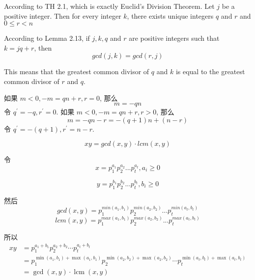 \documentclass[a4paper, justified]{tufte-handout}
\begin{document}
\begin{problem}[CS 2.2-8]
\end{problem}

\begin{solution}
  According to TH 2.1, which is exactly Euclid's Division Theorem. Let $j$ be a positive integer. Then for every integer $k$, there exists unique integers $q$ and $r$ and $0\leq r < n$

  According to Lemma 2.13, if $j,k,q$ and $r$ are positive integers such that $k=jq+r$, then $$gcd(j,k)=gcd(r,j)$$

  This means that the greatest common divisor of $q$ and $k$ is equal to the greatest common divisor of $r$ and $q$.
\end{solution}

\begin{problem}[CS 2.2-16]
\end{problem}

\begin{solution}
  如果 $m<0,-m=q n+r, r=0$, 那么
  $$
    m=-q n
  $$
  令 $q^{\prime}=-q, r^{\prime}=0$.
  如果 $m<0,-m=q n+r, r>0$, 那么
  $$
    m=-q n-r=-(q+1) n+(n-r)
  $$
  令 $q^{\prime}=-(q+1), r^{\prime}=n-r$.
\end{solution}

\begin{problem}[CS 2.2-19]
\end{problem}

\begin{solution}
  $$xy=gcd(x,y)\cdot lcm(x,y)$$

  令$$x=p_1^{a_1}p_2^{a_2}...p_t^{a_t},a_i \geq 0$$

  $$y=p_1^{b_1}p_2^{b_2}...p_t^{b_t},b_i \geq 0$$

  然后
  $$gcd(x,y)=p_1^{min(a_1,b_1)}p_2^{min(a_2,b_2)}...p_t^{min(a_t,b_t)}$$
  $$lcm(x,y)=p_1^{max(a_1,b_1)}p_2^{max(a_2,b_2)}...p_t^{max(a_t,b_t)}$$

  所以
  $$
    \begin{aligned}
      x y & =p_1^{a_1+b_1} p_2^{a_2+b_2} \cdots p_t^{a_t+b_t}                                                                                                                                           \\
          & =p_1^{\min \left(a_1, b_1\right)+\max \left(a_1, b_1\right)} p_2^{\min \left(a_2, b_2\right)+\max \left(a_2, b_2\right)} \cdots p_t^{\min \left(a_t, b_t\right)+\max \left(a_t, b_t\right)} \\
          & =\operatorname{gcd}(x, y) \cdot \operatorname{lcm}(x, y)
    \end{aligned}
  $$
\end{solution}
\beginoptional
\end{document}
